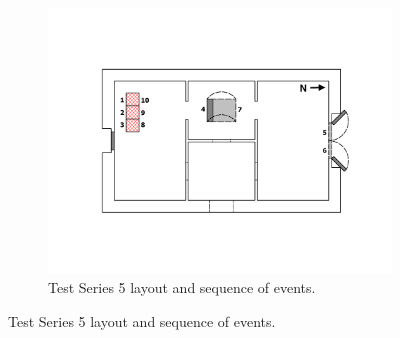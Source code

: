 \documentclass[12pt,oneside]{book}
\begin{document}
\begin{figure}[!ht]
\begin{minipage}[b]{0.8\columnwidth}
\begin{flushleft}
\begin{figure}[!ht]
\begin{minipage}[b]{0.8\columnwidth}
\begin{flushleft}
	\end{flushleft}
\end{minipage}
\begin{minipage}[b]{0.9\columnwidth}
	\vspace{15pt}
	\centering
	\includegraphics[width=\columnwidth]{../Figures/Floor_Plans/East_Structure_Test_5}
\end{minipage}
\caption{Test Series 5 layout and sequence of events.}
\label{fig:east_test_5}
\end{figure}


\end{flushleft}
\end{minipage}
\end{figure}
\end{document}
